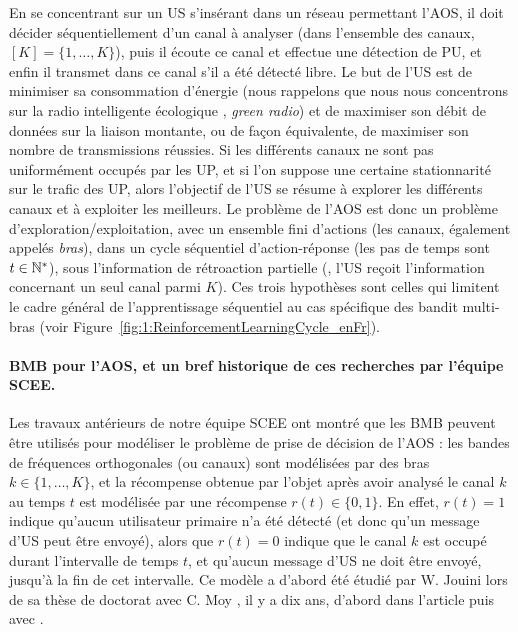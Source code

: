 \begin{resume_fr}
En se concentrant sur un US s'insérant dans un réseau permettant l'AOS, il doit décider séquentiellement d'un canal à analyser (dans l'ensemble des canaux, $[K]=\{1,\dots,K\}$), puis il écoute ce canal et effectue une détection de PU, et enfin il transmet dans ce canal s'il a été détecté libre.
Le but de l'US est de minimiser sa consommation d'énergie (nous rappelons que nous nous concentrons sur la radio intelligente \guillemotleft{} écologique \guillemotright{}, \emph{green radio}) et de maximiser son débit de données sur la liaison montante, ou de façon équivalente, de maximiser son nombre de transmissions réussies.
%
Si les différents canaux ne sont pas uniformément occupés par les UP, et si l'on suppose une certaine stationnarité sur le trafic des UP, alors l'objectif de l'US se résume à explorer les différents canaux et à exploiter les meilleurs.
Le problème de l'AOS est donc un problème d'exploration/exploitation, avec un ensemble fini d'actions (les canaux, également appelés \emph{bras}),
dans un cycle séquentiel d'action-réponse (les pas de temps sont $t\in\mathbb{N}^*$),
sous l'information de rétroaction partielle (\ie, l'US reçoit l'information concernant un seul canal parmi $K$).
Ces trois hypothèses sont celles qui limitent le cadre général de l'apprentissage séquentiel au cas spécifique des bandit multi-bras (voir Figure~\ref{fig:1:ReinforcementLearningCycle_enFr}).


\paragraph{BMB pour l'AOS, et un bref historique de ces recherches par l'équipe SCEE.}
%
Les travaux antérieurs de notre équipe SCEE ont montré que les BMB peuvent être utilisés pour modéliser le problème de prise de décision de l'AOS :
les bandes de fréquences orthogonales (ou canaux) sont modélisées par des bras $k\in\{1,\dots,K\}$,
et la récompense obtenue par l'objet après avoir analysé le canal $k$ au temps $t$ est modélisée par une récompense $r(t) \in \{0,1\}$.
En effet, $r(t) = 1$ indique qu'aucun utilisateur primaire n'a été détecté (et donc qu'un message d'US peut être envoyé), alors que $r(t)=0$ indique que le canal $k$ est occupé durant l'intervalle de temps $t$, et qu'aucun message d'US ne doit être envoyé, jusqu'à la fin de cet intervalle.
%
Ce modèle a d'abord été étudié par W. Jouini lors de sa thèse de doctorat avec C. Moy \cite{Jouini12PhD}, il y a dix ans, d'abord dans l'article \cite{Jouini09} puis avec \cite{Jouini10,Jouini12}.


\end{resume_fr}

